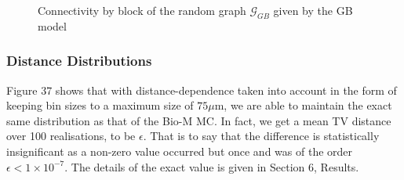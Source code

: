 \begin{figure}[H]%
    \centering
    \captionsetup{justification=centering}
    \qquad
    \caption{Connectivity by block of the random graph $\mathcal{G}_{GB}$ given by the GB model}%
    \label{fig:example}%
\end{figure}

\subsubsection{Distance Distributions}
Figure 37 shows that with distance-dependence taken into account in the form of keeping bin sizes to a maximum size of $75\mu$m, we are able to maintain the exact same distribution as that of the Bio-M MC. In fact, we get a mean TV distance over 100 realisations, to be $\epsilon$. That is to say that the difference is statistically insignificant as a non-zero value occurred but once and was of the order $\epsilon < 1\times10^{-7}$. The details of the exact value is given in Section 6, Results.

